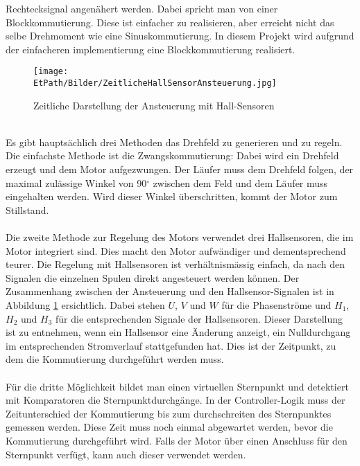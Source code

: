         Rechtecksignal angenähert werden. Dabei spricht man von einer 
        Blockkommutierung. Diese ist einfacher zu realisieren, aber erreicht 
        nicht das selbe Drehmoment wie eine Sinuskommutierung. In diesem 
        Projekt wird aufgrund der einfacheren implementierung eine 
        Blockkommutierung realisiert. \\
        \ifSTANDALONE
           \begin{figure}[h!]
               \centering
               \texttt{[image: \\EtPath/Bilder/ZeitlicheHallSensorAnsteuerung.jpg]}
               \caption[Zeitliche Darstellung der Ansteuerung mit 
                   Hall-Sensoren]{Zeitliche Darstellung der Ansteuerung mit 
                   Hall-Sensoren \cite{AppNote:BrushlessuC}}
              	\centering
               \label{abb:ZeitlicheAnsteuerungBrushlessMotor}
           \end{figure}
      \fi
       \\
        Es gibt hauptsächlich drei Methoden das Drehfeld zu generieren und zu 
        regeln. Die einfachste Methode ist die Zwangskommutierung: 
        Dabei wird ein Drehfeld erzeugt und dem Motor aufgezwungen. Der Läufer 
        muss dem Drehfeld folgen, der maximal zulässige Winkel von 90$^\circ$
        zwischen dem Feld und dem Läufer muss eingehalten werden. Wird dieser 
        Winkel überschritten, kommt der Motor zum Stillstand.\\
        \\
        Die zweite Methode zur Regelung des Motors verwendet drei Hallsensoren, die im 
        Motor integriert sind. Dies macht den Motor aufwändiger und 
        dementsprechend teurer. Die Regelung mit Hallsensoren ist 
        verhältnismässig einfach, da nach den Signalen die einzelnen Spulen 
        direkt angesteuert werden können. Der Zusammenhang zwischen der 
        Ansteuerung und den Hallsensor-Signalen ist in Abbildung 
        \ref{abb:ZeitlicheAnsteuerungBrushlessMotor} ersichtlich. Dabei stehen 
        $U$, $V$ und $W$ für die Phasenströme und $H_1$, $H_2$ und $H_3$ für die 
        entsprechenden Signale der Hallsensoren. Dieser Darstellung ist zu 
        entnehmen, wenn ein Hallsensor eine Änderung anzeigt, 
        ein Nulldurchgang im entsprechenden Stromverlauf stattgefunden hat. 
        Dies ist der Zeitpunkt, zu dem die Kommutierung durchgeführt werden 
        muss.\\
        \\
        Für die dritte Möglichkeit bildet man einen virtuellen Sternpunkt 
        und detektiert mit Komparatoren die Sternpunktdurchgänge. 
        In der Controller-Logik muss der Zeitunterschied der Kommutierung 
        bis zum durchschreiten des Sternpunktes gemessen werden. Diese Zeit 
        muss noch einmal abgewartet werden, bevor die Kommutierung durchgeführt 
        wird. Falls der Motor über einen Anschluss für den Sternpunkt 
        verfügt, kann auch dieser verwendet werden. 
    \ifSTANDALONE
